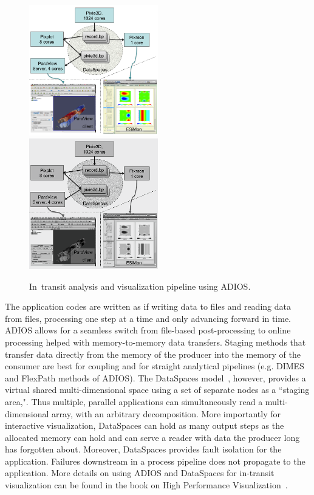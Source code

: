 \begin{figure}[h!]
\centering
\myIfColor
{
\includegraphics[width=0.5\textwidth]{Chapters/part3-ch6-adios/figs/intransitviz.png}
}
{
\includegraphics[width=0.5\textwidth]{Chapters/part3-ch6-adios/figs/intransitviz-bw.png}
}
\caption[]
{In~transit analysis and visualization pipeline using ADIOS.
}
\label{part3-ch6-adios:fig:intransitviz}
\end{figure}

The application codes are written as if writing data to files and reading data from files, processing one step at a time and only advancing forward in time. ADIOS allows for a seamless switch from file-based post-processing to online processing helped with memory-to-memory data transfers. Staging methods that transfer data directly from the memory of the producer into the memory of the consumer are best for coupling and for straight analytical pipelines (e.g. DIMES and FlexPath methods of ADIOS). The DataSpaces model~\cite{ADIOS:Docan:cluster12}, however, provides a virtual shared multi-dimensional space using a set of separate nodes as a ``staging area,". Thus multiple, parallel applications can simultaneously read a multi-dimensional array, with an arbitrary decomposition. More importantly for interactive visualization, DataSpaces can hold as many output steps as the allocated memory can hold and can serve a reader with data the producer long has forgotten about. Moreover, DataSpaces provides fault isolation for the application. Failures downstream in a process pipeline does not propagate to the application. More details on using ADIOS and DataSpaces for in-transit visualization can be found in the book on High Performance Visualization~\cite{ADIOS:Bethel-Childs-Hansen:HPV:2012}.


